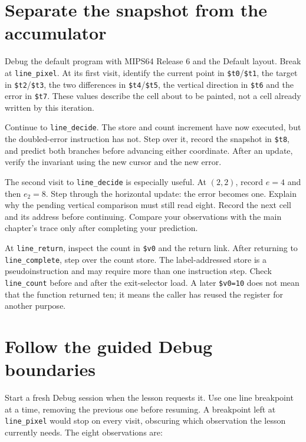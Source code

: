 \section{Separate the snapshot from the accumulator}

Debug the default program with MIPS64 Release 6 and the Default layout. Break at
\texttt{line\_pixel}. At its first visit, identify the current point in
\texttt{\$t0}/\texttt{\$t1}, the target in \texttt{\$t2}/\texttt{\$t3}, the two
differences in \texttt{\$t4}/\texttt{\$t5}, the vertical direction in
\texttt{\$t6} and the error in \texttt{\$t7}. These values describe the cell about
to be painted, not a cell already written by this iteration.

Continue to \texttt{line\_decide}. The store and count increment have now executed,
but the doubled-error instruction has not. Step over it, record the snapshot in
\texttt{\$t8}, and predict both branches before advancing either coordinate.
After an update, verify the invariant using the new cursor and the new error.

The second visit to \texttt{line\_decide} is especially useful. At $(2,2)$, record
$e=4$ and then $e_2=8$. Step through the horizontal update: the error becomes one.
Explain why the pending vertical comparison must still read eight. Record the
next cell and its address before continuing. Compare your observations with the
main chapter's trace only after completing your prediction.

At \texttt{line\_return}, inspect the count in \texttt{\$v0} and the return link.
After returning to \texttt{line\_complete}, step over the count store. The label-addressed store is a pseudoinstruction and may require more than one
instruction step. Check \texttt{line\_count} before and after the exit-selector load. A later
\texttt{\$v0=10} does not mean that the function returned ten; it means the caller
has reused the register for another purpose.

\section{Follow the guided Debug boundaries}

Start a fresh Debug session when the lesson requests it. Use one line breakpoint
at a time, removing the previous one before resuming. A breakpoint left at
\texttt{line\_pixel} would stop on every visit, obscuring which observation the
lesson currently needs. The eight observations are:

